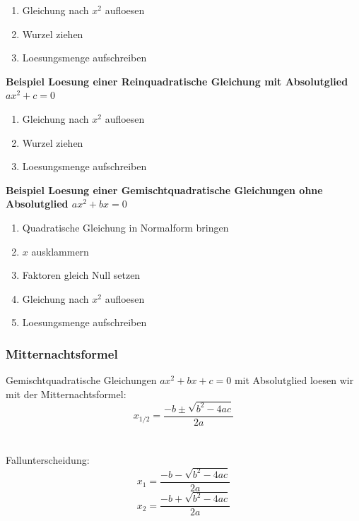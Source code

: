 \begin{multicols}{2}
    \begin{enumerate}
        \item Gleichung nach $x^2$ aufloesen
        \item Wurzel ziehen
        \item Loesungsmenge aufschreiben
    \end{enumerate}
    \textbf{Beispiel Loesung einer Reinquadratische Gleichung mit Absolutglied $ax^2 + c = 0$}

    \begin{enumerate}
        \item Gleichung nach $x^2$ aufloesen
        \item Wurzel ziehen
        \item Loesungsmenge aufschreiben
    \end{enumerate}
    \textbf{Beispiel Loesung einer Gemischtquadratische Gleichungen ohne Absolutglied $ax^2 + bx = 0$}

    \begin{enumerate}
        \item Quadratische Gleichung in Normalform bringen
        \item $x$ ausklammern
        \item  Faktoren gleich Null setzen
        \item Gleichung nach $x^2$ aufloesen
        \item Loesungsmenge aufschreiben
    \end{enumerate}

    \subsubsection{Mitternachtsformel}
    \vspace{-4mm}
    Gemischtquadratische Gleichungen $ax^2 + bx + c = 0$ mit Absolutglied loesen wir mit der Mitternachtsformel:
    \[x_{1/2} = \frac{-b \pm \sqrt{b^2 - 4ac}}{2a}\]\\~\\
    Fallunterscheidung:
    \[x_{1} = \dfrac{-b - \sqrt{b^2 - 4ac}}{2a}\]
    \[x_{2} = \dfrac{-b + \sqrt{b^2 - 4ac}}{2a}\]\\~\\


\end{multicols}
